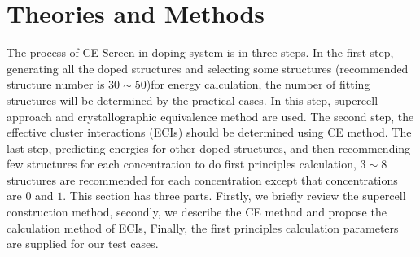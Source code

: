 \documentclass[aps,preprint,amsmath,amssymb]{revtex4}
\begin{document}
\section{Theories and Methods}
The process of CE Screen in doping system is in three steps.
In the first step, generating all the doped structures and selecting
some structures (recommended structure number is $30\sim50$)for energy calculation,
the number of fitting structures will be determined by the practical cases.
In this step, supercell approach and crystallographic equivalence method are used.
The second step, the effective cluster interactions (ECIs) should be determined using CE method.
The last step, predicting energies for other doped structures,
and then recommending few structures for each concentration to do first principles calculation,
$3\sim8$ structures are recommended for each concentration except that concentrations are $0$ and $1$.
This section has three parts. Firstly, we briefly review the supercell construction method,
secondly, we describe the CE method and propose the calculation method of ECIs,
Finally, the first principles calculation parameters are supplied for our test cases.
\end{document}
